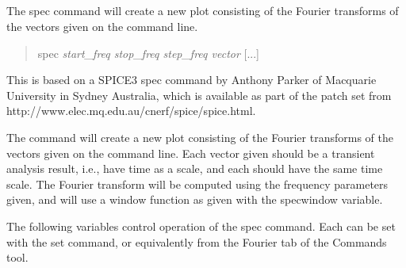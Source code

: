 \subsection{}


The {\cb spec} command will create a new plot consisting of the
Fourier transforms of the vectors given on the command line.
\begin{quote}\vt
spec {\it start\_freq stop\_freq step\_freq vector} [...]
\end{quote}
This is based on a SPICE3 {\cb spec} command by Anthony Parker of
Macquarie University in Sydney Australia, which is available as part
of the patch set from\\
{\vt http://www.elec.mq.edu.au/cnerf/spice/spice.html}.

The command will create a new plot consisting of the Fourier
transforms of the vectors given on the command line.  Each vector
given should be a transient analysis result, i.e., have time as a
scale, and each should have the same time scale.  The Fourier
transform will be computed using the frequency parameters given, and
will use a window function as given with the {\et specwindow}
variable.

The following variables control operation of the {\cb spec} command. 
Each can be set with the {\cb set} command, or equivalently from the
{\cb Fourier} tab of the {\cb Commands} tool.

